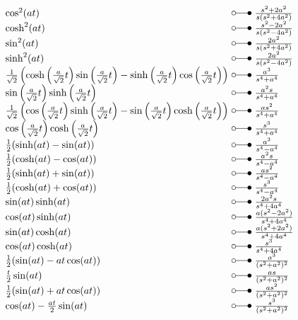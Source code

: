 \[ \begin{array}{@{}l@{ ~ \laplace ~ }l@{}}
\cos^2(at) &
    \frac{s^2 + 2a^2}{s (s^2 + 4a^2)} \\
\cosh^2(at) &
    \frac{s^2 - 2a^2}{s (s^2 - 4a^2)} \\
\sin^2(at) &
    \frac{2a^2}{s (s^2 + 4a^2)} \\
\sinh^2(at) &
    \frac{2a^2}{s (s^2 - 4a^2)} \\
\frac{1}{\sqrt{2}} \left(\cosh\left(\frac{a}{\sqrt{2}}t\right) \sin\left(\frac{a}{\sqrt{2}}t\right) - \sinh\left(\frac{a}{\sqrt{2}}t\right) \cos\left(\frac{a}{\sqrt{2}}t\right)\right) &
    \frac{a^3}{s^4 + a^4} \\
\sin\left(\frac{a}{\sqrt{2}}t\right) \sinh\left(\frac{a}{\sqrt{2}}t\right) &
    \frac{a^2 s}{s^4 + a^4} \\
\frac{1}{\sqrt{2}} \left(\cos\left(\frac{a}{\sqrt{2}}t\right) \sinh\left(\frac{a}{\sqrt{2}}t\right) - \sin\left(\frac{a}{\sqrt{2}}t\right) \cosh\left(\frac{a}{\sqrt{2}}t\right)\right) &
    \frac{a s^2}{s^4 + a^4} \\
\cos\left(\frac{a}{\sqrt{2}}t\right) \cosh\left(\frac{a}{\sqrt{2}}t\right) &
    \frac{s^3}{s^4 + a^4} \\
\frac{1}{2} (\sinh(at) - \sin(at)) &
    \frac{a^3}{s^4 - a^4} \\
\frac{1}{2} (\cosh(at) - \cos(at)) &
    \frac{a^2s}{s^4 - a^4} \\
\frac{1}{2} (\sinh(at) + \sin(at)) & 
    \frac{as^2}{s^4 - a^4} \\
\frac{1}{2} (\cosh(at) + \cos(at)) &
    \frac{s^3}{s^4 - a^4} \\
\sin(at) \sinh(at) &
    \frac{2 a^2 s}{s^4 + 4 a^4} \\
\cos(at) \sinh(at) &
    \frac{a (s^2 - 2 a^2)}{s^4 + 4 a^4} \\
\sin(at) \cosh(at) &
    \frac{a (s^2 + 2 a^2)}{s^4 + 4 a^4} \\
\cos(at) \cosh(at) &
    \frac{s^3}{s^4 + 4 a^4} \\
\frac{1}{2} (\sin(at) - at \cos(at)) &
    \frac{a^3}{(s^2 + a^2)^2} \\
\frac{t}{2} \sin(at) &
    \frac{a s}{(s^2 + a^2)^2} \\
\frac{1}{2} (\sin(at) + at \cos(at)) &
    \frac{a s^2}{(s^2 + a^2)^2} \\
\cos(at) - \frac{at}{2} \sin(at) &
    \frac{s^3}{(s^2 + a^2)^2} \\
\end{array} \]


